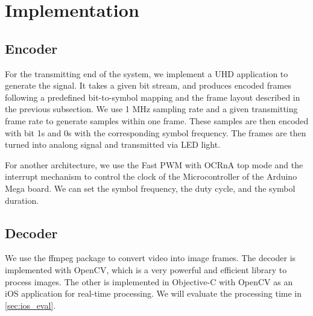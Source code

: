 \section{Implementation}




\subsection{Encoder} 
For the transmitting end of the system, we implement a UHD application to generate the signal. It takes a given bit stream, and produces encoded frames following a predefined bit-to-symbol mapping and the frame layout described in the previous subsection. We use 1 MHz sampling rate and a given transmitting frame rate to generate samples within one frame. These samples are then encoded with bit 1s and 0s with the corresponding symbol frequency.
The frames are then turned into analong signal and transmitted via LED light.

For another architecture, we use the Fast PWM with OCRnA top mode and the interrupt mechanism to control the clock of the Microcontroller of the Arduino Mega board. We can set the symbol frequency, the duty cycle, and the symbol duration.

\subsection{Decoder} 
We use the ffmpeg package to convert video into image frames. The decoder is implemented with OpenCV, which is a very powerful and efficient library to process images.
The other is implemented in Objective-C with OpenCV as an iOS application for real-time processing. We will evaluate the processing time in \autoref{sec:ios_eval}.

